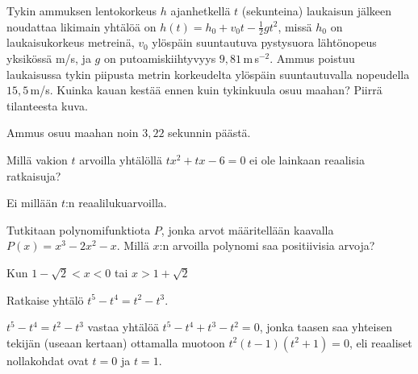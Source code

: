 \begin{tehtava}
Tykin ammuksen lentokorkeus $h$ ajanhetkellä $t$ (sekunteina) laukaisun jälkeen noudattaa likimain yhtälöä on $h(t)=h_0+v_0t-\frac{1}{2}gt^2$, missä $h_0$ on laukaisukorkeus metreinä, $v_0$ ylöspäin suuntautuva pystysuora lähtönopeus yksikössä m/s, ja $g$ on putoamiskiihtyvyys $9,81$\,m\,s$^{-2}$. Ammus poistuu laukaisussa tykin piipusta metrin korkeudelta ylöspäin suuntautuvalla nopeudella $15,5$\,m/s. Kuinka kauan kestää ennen kuin tykinkuula osuu maahan? Piirrä tilanteesta kuva.
	\begin{vastaus}
	Ammus osuu maahan noin $3,22$ sekunnin päästä. %
	\end{vastaus}
\end{tehtava}

\begin{tehtava}
Millä vakion $t$ arvoilla yhtälöllä $tx^2+tx-6=0$ ei ole lainkaan reaalisia ratkaisuja?
	\begin{vastaus}
Ei millään $t$:n reaalilukuarvoilla.
	\end{vastaus}
\end{tehtava}

\begin{tehtava}
Tutkitaan polynomifunktiota $P$, jonka arvot määritellään kaavalla $P(x)=x^3-2x^2-x$. Millä $x$:n arvoilla polynomi saa positiivisia arvoja?
	\begin{vastaus}
	Kun $1-\sqrt{2}<x<0$ tai $x>1+\sqrt{2}$
	\end{vastaus}
\end{tehtava}

\begin{tehtava}
Ratkaise yhtälö $t^5-t^4=t^2-t^3$.
	\begin{vastaus}
$t^5-t^4=t^2-t^3$ vastaa yhtälöä $t^5-t^4+t^3-t^2=0$, jonka taasen saa yhteisen tekijän (useaan kertaan) ottamalla muotoon $t^2(t-1)(t^2+1)=0$, eli reaaliset nollakohdat ovat $t=0$ ja $t=1$.
	\end{vastaus}
\end{tehtava}

